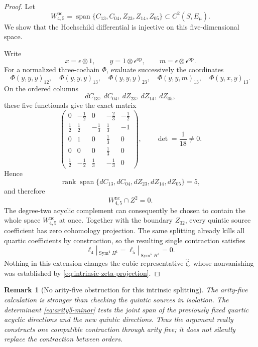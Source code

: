 \documentclass[11pt]{amsart}
\newtheorem{remark}[theorem]{Remark}
\newcommand{\Span}{\operatorname{span}}
\newcommand{\rank}{\operatorname{rank}}
\begin{document}
\begin{proof}
Let
\[
W_{4,5}^{\mathrm{nc}}
=
\Span\{C_{13},C_{04},Z_{23},Z_{14},Z_{05}\}
\subset C^2(S,E_\mu).
\]
We show that the Hochschild differential is injective on this five-dimensional space.

Write
\[
x=\epsilon\otimes1,
\qquad
y=1\otimes\epsilon^{\mathrm{op}},
\qquad
m=\epsilon\otimes\epsilon^{\mathrm{op}}.
\]
For a normalized three-cochain $\Phi$, evaluate successively the coordinates
\[
\Phi(y,y,y)_{12},\quad
\Phi(y,y,y)_{13},\quad
\Phi(y,y,y)_{23},\quad
\Phi(y,y,m)_{13},\quad
\Phi(y,x,y)_{13}.
\]
On the ordered columns
\[
dC_{13},\ dC_{04},\ dZ_{23},\ dZ_{14},\ dZ_{05},
\]
these five functionals give the exact matrix
\begin{equation}\label{eq:arity5-minor}
\begin{pmatrix}
0&-\tfrac12&0&-\tfrac23&-\tfrac12\\
\tfrac12&\tfrac12&-\tfrac13&\tfrac13&-1\\
0&1&0&\tfrac13&0\\
0&0&0&\tfrac13&0\\
\tfrac12&-\tfrac12&\tfrac13&-\tfrac13&0
\end{pmatrix},
\qquad
\det=\frac1{18}\ne0.
\end{equation}
Hence
\[
\rank\Span\{dC_{13},dC_{04},dZ_{23},dZ_{14},dZ_{05}\}=5,
\]
and therefore
\[
W_{4,5}^{\mathrm{nc}}\cap Z^2=0.
\]
The degree-two acyclic complement can consequently be chosen to contain the whole space $W_{4,5}^{\mathrm{nc}}$ at once.  Together with the boundary $Z_{32}$, every quintic source coefficient has zero cohomology projection.  The same splitting already kills all quartic coefficients by construction, so the resulting single contraction satisfies
\[
\ell_4|_{\operatorname{Sym}^4H^1}
=
\ell_5|_{\operatorname{Sym}^5H^1}
=0.
\]
Nothing in this extension changes the cubic representative $\widehat\zeta$, whose nonvanishing was established by \eqref{eq:intrinsic-zeta-projection}.
\end{proof}

\begin{remark}[No arity-five obstruction for this intrinsic splitting]
The arity-five calculation is stronger than checking the quintic sources in isolation.  The determinant \eqref{eq:arity5-minor} tests the \emph{joint} span of the previously fixed quartic acyclic directions and the new quintic directions.  Thus the argument really constructs one compatible contraction through arity five; it does not silently replace the contraction between orders.
\end{remark}
\end{document}
